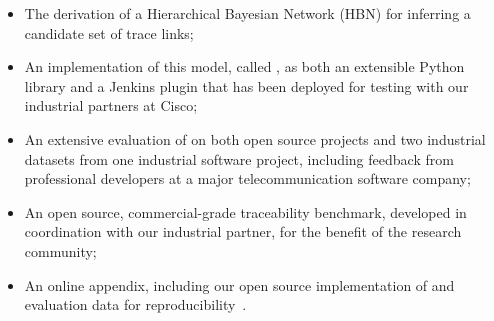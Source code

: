 \begin{itemize}
	\item{The derivation of a Hierarchical Bayesian Network (HBN) for inferring a candidate set of trace links;}	
	\item{An implementation of this model, called \Comet, as both an extensible Python library and a Jenkins plugin that has been deployed for testing with our industrial partners at Cisco;}
	\item{An extensive evaluation of \Comet on both open source projects and two industrial datasets from one industrial software project, including feedback from professional developers at a major telecommunication software company;}
	\item{An open source, commercial-grade traceability benchmark, developed in coordination with our industrial partner, for the benefit of the research community;}
	\item{An online appendix, including our open source implementation of \Comet and evaluation data for reproducibility~\cite{appendix}}.
\end{itemize}















